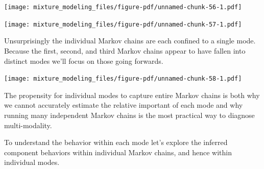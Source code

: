 \documentclass[
  letterpaper,
  DIV=11,
  numbers=noendperiod]{scrartcl}
\newenvironment{Shaded}{\begin{snugshade}}{\end{snugshade}}
\newcommand{\ControlFlowTok}[1]{\textcolor[rgb]{0.00,0.23,0.31}{#1}}
\newcommand{\DecValTok}[1]{\textcolor[rgb]{0.68,0.00,0.00}{#1}}
\newcommand{\FunctionTok}[1]{\textcolor[rgb]{0.28,0.35,0.67}{#1}}
\newcommand{\NormalTok}[1]{\textcolor[rgb]{0.00,0.23,0.31}{#1}}
\newcommand{\OtherTok}[1]{\textcolor[rgb]{0.00,0.23,0.31}{#1}}
\newcommand{\SpecialCharTok}[1]{\textcolor[rgb]{0.37,0.37,0.37}{#1}}
\newcommand{\StringTok}[1]{\textcolor[rgb]{0.13,0.47,0.30}{#1}}
\begin{document}
\texttt{[image: mixture\_modeling\_files/figure-pdf/unnamed-chunk-56-1.pdf]}

\begin{Shaded}
\end{Shaded}

\texttt{[image: mixture\_modeling\_files/figure-pdf/unnamed-chunk-57-1.pdf]}

Unsurprisingly the individual Markov chains are each confined to a
single mode. Because the first, second, and third Markov chains appear
to have fallen into distinct modes we'll focus on those going forwards.

\begin{Shaded}
\end{Shaded}

\texttt{[image: mixture\_modeling\_files/figure-pdf/unnamed-chunk-58-1.pdf]}

The propensity for individual modes to capture entire Markov chains is
both why we cannot accurately estimate the relative important of each
mode and why running many independent Markov chains is the most
practical way to diagnose multi-modality.

To understand the behavior within each mode let's explore the inferred
component behaviors within individual Markov chains, and hence within
individual modes.
\end{document}
